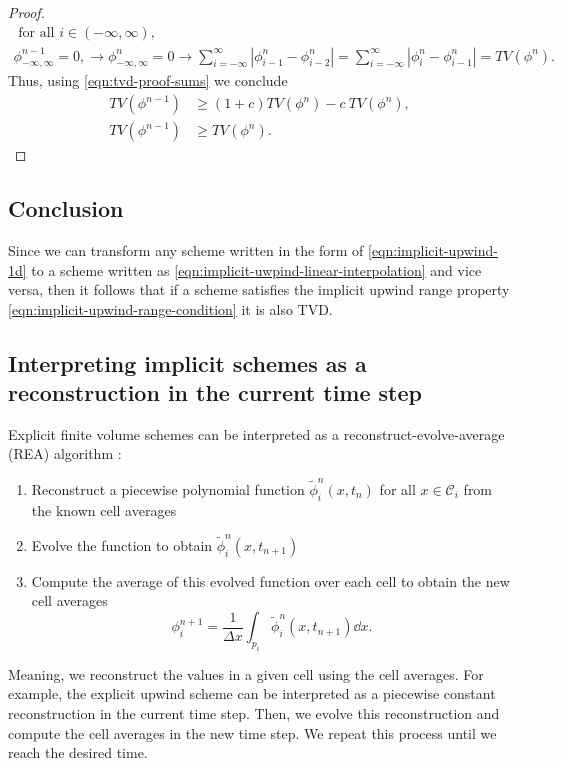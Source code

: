 \documentclass[../thesis.tex]{subfiles}
\begin{document}
\begin{theorem}
\begin{proof}
\begin{equation}
\begin{split}
        \text{ for all } i \in (-\infty,\infty),
        \\
        \phi_{-\infty,\infty}^{n-1} = 0,
        \rightarrow
        \phi_{-\infty,\infty}^{n} = 0
        \rightarrow
        \sum_{i=-\infty}^{\infty} |\phi_{i-1}^{n} - \phi_{i-2}^{n}|
        = \sum_{i=-\infty}^{\infty}|\phi_{i}^{n} - \phi_{i-1}^{n}|
        =TV(\phi^{n}).
    \end{split}
\end{equation}
Thus, using \eqref{eqn:tvd-proof-sums} we conclude
\begin{equation}
    \begin{split}
        TV(\phi^{n-1})
        &\geq
        (1+c)TV(\phi^{n}) - c~TV(\phi^{n}),
        \\
        TV(\phi^{n-1})
        &\geq
        TV(\phi^{n}).
    \end{split}
\end{equation}
\end{proof}
\end{theorem}
\subsection{Conclusion}
Since we can transform any scheme written in the form of \eqref{eqn:implicit-upwind-1d}
to a scheme written as \eqref{eqn:implicit-uwpind-linear-interpolation} and
vice versa, then it follows that if a scheme satisfies the implicit upwind range property \eqref{eqn:implicit-upwind-range-condition} it is also TVD.
\subsection{Interpreting implicit schemes as a reconstruction in the current time step}

Explicit finite volume schemes can be interpreted as a reconstruct-evolve-average (REA)
algorithm \cite{1992_LeVeque_BOOK,2002_LeVeque_BOOK,1977_VanLeer}:
\begin{enumerate}
    \item Reconstruct a piecewise polynomial function \(\tilde{\phi}_{i}^{n}(x,t_n)\) for all \(x \in \mathcal{C}_i\) from the known cell averages
    \item Evolve the function to obtain \(\tilde{\phi}_{i}^{n}(x,t_{n+1})\)
    \item Compute the average of this evolved function over each cell to obtain the new cell averages\[\phi_{i}^{n+1} =\frac{1}{\Delta x}\int_{p_i}\tilde{\phi}_{i}^{n}(x,t_{n+1}) \dd{x}.\]
\end{enumerate}
Meaning, we reconstruct the values in a given cell using the cell averages.
For example, the explicit upwind scheme can be interpreted as a piecewise constant reconstruction in the current time step. Then, we evolve this reconstruction and compute
the cell averages in the new time step. We repeat this process until we reach the
desired time.
\end{document}
